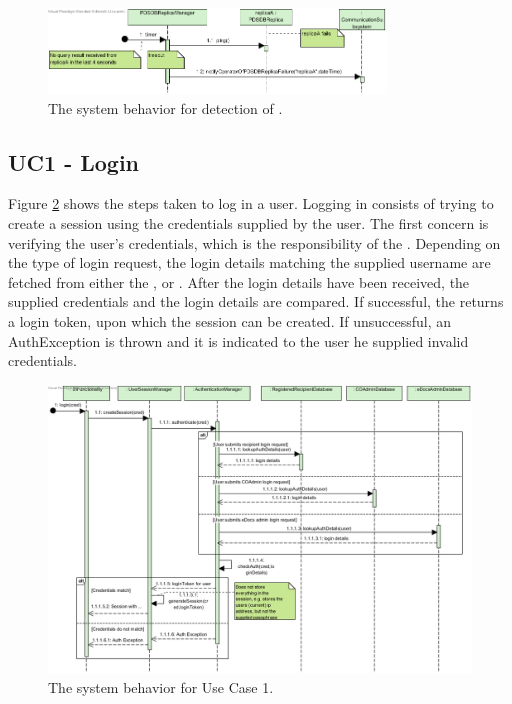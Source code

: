 \begin{figure}[!htp]
    \centering
    \includegraphics[width=0.8\textwidth]{figures/Av2 - PDSDBReplica fails.png}
    \caption{The system behavior for detection of .
        }\label{fig:seq_av2fail}
\end{figure}

\subsection{UC1 - Login}\label{sec:seq_uc1}
Figure \ref{fig:seq_uc1} shows the steps taken to log in a user. Logging in consists of trying to create a session using the credentials supplied by the user. The first concern is verifying the user's credentials, which is the responsibility of the . Depending on the type of login request, the login details matching the supplied username are fetched from either the ,  or . After the login details have been received, the supplied credentials and the login details are compared. If successful, the  returns a login token, upon which the session can be created. If unsuccessful, an AuthException is thrown and it is indicated to the user he supplied invalid credentials.

\begin{figure}[!htp]
    \centering
    \includegraphics[width=\textwidth]{figures/UC1 - Login.png}
    \caption{The system behavior for Use Case 1.
        }\label{fig:seq_uc1}
\end{figure}

